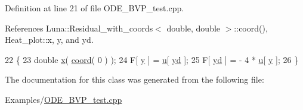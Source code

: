 Definition at line 21 of file O\+D\+E\+\_\+\+B\+V\+P\+\_\+test.\+cpp.



References Luna\+::\+Residual\+\_\+with\+\_\+coords$<$ double, double $>$\+::coord(), Heat\+\_\+plot\+::x, y, and yd.


\begin{DoxyCode}
22             \{
23         \textcolor{keywordtype}{double} \hyperlink{namespaceHeat__plot_aa88370c16b85b784ccbde3ed88bc1991}{x}( \hyperlink{classLuna_1_1Residual__with__coords_a3fa4c950a944743c0380e4c151728372}{coord}( 0 ) );
24                 F[ \hyperlink{ODE__BVP__test_8cpp_adf764cbdea00d65edcd07bb9953ad2b7ae1f9fdb8b786c63efc4ce44eeacd17f2}{y} ]   = \hyperlink{namespaceHeat__plot_ae622b86afa46daa3e9b887624ab1bf26}{u}[ \hyperlink{ODE__BVP__test_8cpp_adf764cbdea00d65edcd07bb9953ad2b7ae006cbf64cf3ff4ee152bf490ae2e2a7}{yd} ];
25                 F[ \hyperlink{ODE__BVP__test_8cpp_adf764cbdea00d65edcd07bb9953ad2b7ae006cbf64cf3ff4ee152bf490ae2e2a7}{yd} ]  = - 4 * \hyperlink{namespaceHeat__plot_ae622b86afa46daa3e9b887624ab1bf26}{u}[ \hyperlink{ODE__BVP__test_8cpp_adf764cbdea00d65edcd07bb9953ad2b7ae1f9fdb8b786c63efc4ce44eeacd17f2}{y} ];
26             \}
\end{DoxyCode}


The documentation for this class was generated from the following file\+:\begin{DoxyCompactItemize}
\item 
Examples/\hyperlink{ODE__BVP__test_8cpp}{O\+D\+E\+\_\+\+B\+V\+P\+\_\+test.\+cpp}\end{DoxyCompactItemize}
